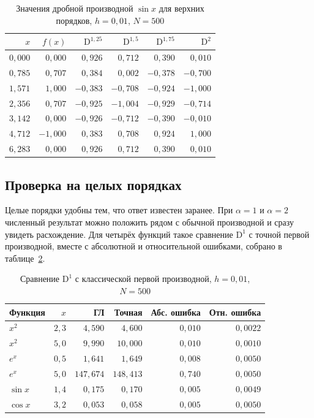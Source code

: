 \documentclass[14pt,a4paper]{extarticle}
\newcommand{\D}{\mathrm{D}}
\begin{document}
\begin{table}[htbp]
\centering
\caption{Значения дробной производной $\sin x$ для верхних порядков, $h=0{,}01$, $N=500$}
\label{tab:sinval-high}
\begin{tabular}{|r|r|r|r|r|r|}
\hline
$x$ & $f(x)$ & $\D^{1{,}25}$ & $\D^{1{,}5}$ & $\D^{1{,}75}$ & $\D^{2}$ \\
\hline
$0{,}000$ & $0{,}000$ & $0{,}926$ & $0{,}712$ & $0{,}390$ & $0{,}010$ \\
\hline
$0{,}785$ & $0{,}707$ & $0{,}384$ & $0{,}002$ & $-0{,}378$ & $-0{,}700$ \\
\hline
$1{,}571$ & $1{,}000$ & $-0{,}383$ & $-0{,}708$ & $-0{,}924$ & $-1{,}000$ \\
\hline
$2{,}356$ & $0{,}707$ & $-0{,}925$ & $-1{,}004$ & $-0{,}929$ & $-0{,}714$ \\
\hline
$3{,}142$ & $0{,}000$ & $-0{,}926$ & $-0{,}712$ & $-0{,}390$ & $-0{,}010$ \\
\hline
$4{,}712$ & $-1{,}000$ & $0{,}383$ & $0{,}708$ & $0{,}924$ & $1{,}000$ \\
\hline
$6{,}283$ & $0{,}000$ & $0{,}926$ & $0{,}712$ & $0{,}390$ & $0{,}010$ \\
\hline
\end{tabular}
\end{table}

\subsection{Проверка на целых порядках}

Целые порядки удобны тем, что ответ известен заранее. При $\alpha=1$ и $\alpha=2$ численный результат можно положить рядом с обычной производной и сразу увидеть расхождение. Для четырёх функций такое сравнение $\D^1$ с точной первой производной, вместе с абсолютной и относительной ошибками, собрано в таблице~\ref{tab:cmp}.

\begin{table}[htbp]
\centering
\caption{Сравнение $\D^1$ с классической первой производной, $h=0{,}01$, $N=500$}
\label{tab:cmp}
\begin{tabular}{|l|r|r|r|r|r|}
\hline
Функция & $x$ & ГЛ & Точная & Абс. ошибка & Отн. ошибка \\
\hline
$x^2$ & $2{,}3$ & $4{,}590$ & $4{,}600$ & $0{,}010$ & $0{,}0022$ \\
\hline
$x^2$ & $5{,}0$ & $9{,}990$ & $10{,}000$ & $0{,}010$ & $0{,}0010$ \\
\hline
$e^x$ & $0{,}5$ & $1{,}641$ & $1{,}649$ & $0{,}008$ & $0{,}0050$ \\
\hline
$e^x$ & $5{,}0$ & $147{,}674$ & $148{,}413$ & $0{,}740$ & $0{,}0050$ \\
\hline
$\sin x$ & $1{,}4$ & $0{,}175$ & $0{,}170$ & $0{,}005$ & $0{,}0049$ \\
\hline
$\cos x$ & $3{,}2$ & $0{,}053$ & $0{,}058$ & $0{,}005$ & $0{,}0050$ \\
\hline
\end{tabular}
\end{table}
\end{document}

